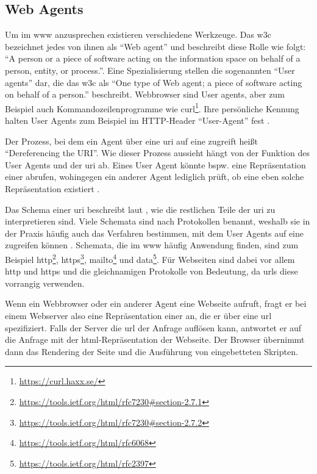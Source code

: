     \subsection{Web Agents}
        Um {\resources} im \gls{www} anzusprechen existieren verschiedene Werkzeuge.
        Das \gls{w3c} \cite[Kapitel 6]{w3c:wwwArch} bezeichnet jedes von ihnen als
        "`Web agent"' und beschreibt diese Rolle wie folgt:
        "`A person or a piece of software acting on the information
        space on behalf of a person, entity, or process."'.
        Eine Spezialisierung stellen die sogenannten "`User agents"' dar,
        die das \gls{w3c} \cite[Kapitel 6]{w3c:wwwArch} als "`One type of Web agent;
        a piece of software acting on behalf of a person."' beschreibt.
        Webbrowser sind User agents, aber zum Beispiel auch Kommandozeilenprogramme
        wie curl\footnote{\url{https://curl.haxx.se/}}.
        Ihre persönliche Kennung halten User Agents zum Beispiel im
        HTTP-Header "`User-Agent"' fest \cite[Kapitel 5.5.3, Seite 46]{rfc:7231}.

        Der Prozess, bei dem ein Agent über eine \gls{uri} auf eine {\resource}
        zugreift heißt "`Dereferencing the URI"'.
        Wie dieser Prozess aussieht hängt von der Funktion des User Agents und der \gls{uri} ab.
        Eines User Agent könnte bspw. eine
        Repräsentation einer {\resource} abrufen, wohingegen ein anderer Agent
        lediglich prüft, ob eine eben solche Repräsentation existiert
        \cite[Kapitel 3.1]{w3c:wwwArch}.

        Das Schema einer \gls{uri} beschreibt laut \cite[Kapitel 3.1]{rfc:3986},
        wie die restlichen Teile der \gls{uri} zu interpretieren sind.
        Viele Schemata sind nach Protokollen benannt,
        weshalb sie in der Praxis häufig auch das Verfahren bestimmen,
        mit dem User Agents auf eine {\resource} zugreifen können
        \cite[Kapitel 3.1]{w3c:wwwArch}.
        Schemata, die im \gls{www} häufig Anwendung finden,
        sind zum Beispiel
        http\footnote{\url{https://tools.ietf.org/html/rfc7230\#section-2.7.1}},
        https\footnote{\url{https://tools.ietf.org/html/rfc7230\#section-2.7.2}},
        mailto\footnote{\url{https://tools.ietf.org/html/rfc6068}} und
        data\footnote{\url{https://tools.ietf.org/html/rfc2397}}.
        Für Webseiten sind dabei vor allem http und https
        und die gleichnamigen Protokolle von Bedeutung,
        da \glspl{url} diese vorrangig verwenden.

        Wenn ein Webbrowser oder ein anderer Agent eine Webseite aufruft,
        fragt er bei einem Webserver also eine Repräsentation
        einer {\resource} an, die er über eine \gls{url} spezifiziert.
        Falls der Server die \gls{url} der Anfrage auflösen kann,
        antwortet er auf die Anfrage mit der \acrshort{html}-Repräsentation der Webseite.
        Der Browser übernimmt dann das Rendering der Seite und die Ausführung
        von eingebetteten Skripten.

